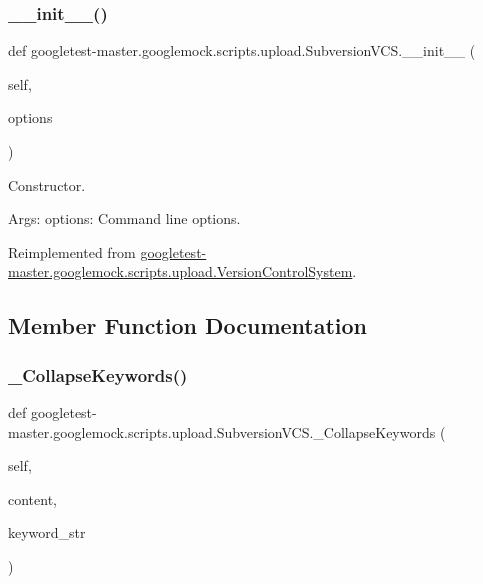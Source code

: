 \subsubsection{\texorpdfstring{\_\_init\_\_()}{\_\_init\_\_()}}
{\footnotesize\ttfamily def googletest-\/master.\+googlemock.\+scripts.\+upload.\+Subversion\+V\+C\+S.\+\_\+\+\_\+init\+\_\+\+\_\+ (\begin{DoxyParamCaption}\item[{}]{self,  }\item[{}]{options }\end{DoxyParamCaption})}

\begin{DoxyVerb}Constructor.

Args:
  options: Command line options.
\end{DoxyVerb}
 

Reimplemented from \mbox{\hyperlink{classgoogletest-master_1_1googlemock_1_1scripts_1_1upload_1_1_version_control_system_ac11abe4f52d562e0ad112ab345eda7eb}{googletest-\/master.\+googlemock.\+scripts.\+upload.\+Version\+Control\+System}}.



\subsection{Member Function Documentation}
\mbox{\label{classgoogletest-master_1_1googlemock_1_1scripts_1_1upload_1_1_subversion_v_c_s_ac000ac4c10745c948ed66d4f5638faa0}} 
\subsubsection{\texorpdfstring{\_CollapseKeywords()}{\_CollapseKeywords()}}
{\footnotesize\ttfamily def googletest-\/master.\+googlemock.\+scripts.\+upload.\+Subversion\+V\+C\+S.\+\_\+\+Collapse\+Keywords (\begin{DoxyParamCaption}\item[{}]{self,  }\item[{}]{content,  }\item[{}]{keyword\+\_\+str }\end{DoxyParamCaption})\hspace{0.3cm}{\ttfamily [private]}}

